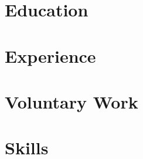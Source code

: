 \documentclass[a4paper]{article}
\newcommand{\src}{"../../Google Drive/cv-source"}
\begin{document}




\section{Education}


\vspace*{-5pt}
\section{Experience}


\vspace*{-5pt}
\section{Voluntary Work}


\vspace*{-5pt}
\section{Skills}


%
\end{document}
